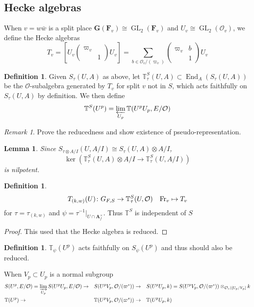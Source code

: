 \documentclass[leqno]{amsart}
\newcommand{\smat}[1]{\left( \begin{smallmatrix} #1 \end{smallmatrix} \right)}
\newcommand{\TT}{\mathbb{T}} %
\newcommand{\GG}{\mathbf G}
\newcommand{\Fr}{\textnormal{Fr}} %
\DeclareMathOperator{\GL}{GL}
\newcommand{\A}{\mathbf A}
\newcommand{\F}{{\mathbf{F}}} %
\newcommand{\oo}{\mathcal{O}} %
\DeclareMathOperator{\End}{End}
\newtheorem{lem}[thm]{Lemma}
\theoremstyle{definition}
\newtheorem{defn}[thm]{Definition}
\theoremstyle{remark}
\newtheorem{rem}[thm]{Remark}
\begin{document}
\subsection{Hecke algebras}

When $v=w\bar{w}$ is a split place
$\GG(\F_v)\cong \GL_2(\F_v)$ and 
$U_v\cong \GL_2(\oo_v)$, we define the Hecke algebras
\[
	T_v=[U_v\smat{\varpi_v&\\&1}U_v]=
	\sum_{b\in \oo_v/(\varpi_v)}\smat{\varpi_v&b\\&1}U_v
\]
\begin{defn}
	Given $S_{\tau}(U,A)$ as above, 
	let $\TT^S_{\tau}(U,A)\subset \End_A(S_{\tau}(U,A))$
	be the $\oo$-subalgebra generated by  $T_v$
	for  split $v$ not in  $S$,
	which acts faithfully on $S_{\tau}(U,A)$
	by definition. 
	We then define 
	\[
		\TT^S(U^p)=\varprojlim_{U_p}
		\TT(U^pU_p, E/\oo)
	\]
\end{defn}

\begin{rem}
	Prove the reducedness and show existence of 
	pseudo-representation.
	\cite[Prop 2.27]{ger}
\end{rem}



\begin{lem}
	Since 
 $S_{\tau\otimes A/I}(U, A/I)\cong S_{\tau}(U, A)\otimes A/I$,
 \[
	 \ker(\TT_{\tau}^S(U,A)\otimes A/I\to \TT_{\tau}^S(U,A/I))
 \]
 is nilpotent.
\end{lem}

\begin{defn}
	\[
		T_{(k,w)}(U)\colon G_{F,S}\to \TT^S_{\tau}
		(U,\oo)\quad
		\Fr_v\mapsto T_v
	\]
	for $\tau=\tau_{(k,w)}$
	and $\psi=\tau^{-1}\vert_{U\cap \A_f^\times}$.
	Thus  $\TT^S$ is independent of  $S$
\end{defn}
\begin{proof}
	This used that the Hecke algebra is reduced.
\end{proof}

\begin{defn}
	$\TT_\psi(U^p)$ acts faithfully on  $S_\psi(U^p)$
	and thus should also be reduced.
\end{defn}

When $V_p\subset U_p$ is a normal subgroup
\begin{align*}
&S(U^p,E/\oo)=\varinjlim_{U_p} S(U^pU_p, E/\oo)\to&
&S(U^pV_p,\oo/(\varpi^s))\to&
&S(U^pU_p,k)=
S(U^pV_p,\oo/(\varpi^s))\otimes_{\oo_s)[U_p/V_p]}k\\
&\TT(U^p)\to&
&\TT(U^pV_p,\oo/(\varpi^s))\to&
&\TT(U^pU_p,k)
\end{align*}
\end{document}

